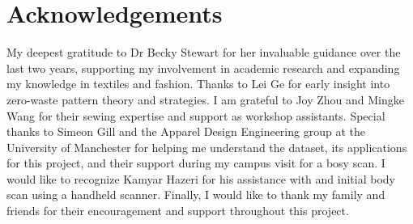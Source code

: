 \chapter*{Acknowledgements}
My deepest gratitude to Dr Becky Stewart for her invaluable guidance over the last two years, supporting my involvement in academic research and expanding my knowledge in textiles and fashion. Thanks to Lei Ge for early insight into zero-waste pattern theory and strategies. I am grateful to Joy Zhou and Mingke Wang for their sewing expertise and support as workshop assistants. Special thanks to Simeon Gill and the Apparel Design Engineering group at the University of Manchester for helping me understand the dataset, its applications for this project, and their support during my campus visit for a bosy scan. I would like to recognize Kamyar Hazeri for his assistance with and initial body scan using a handheld scanner. Finally, I would like to thank my family and friends for their encouragement and support throughout this project.
